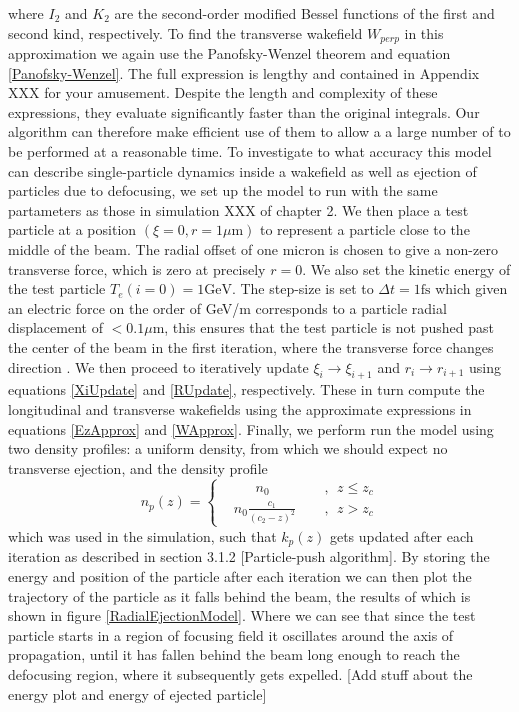 where $I_2$ and $K_2$ are the second-order modified Bessel functions of the first and second kind, respectively. To find the transverse wakefield $W_{perp}$ in this approximation we again use the Panofsky-Wenzel theorem and equation \ref{Panofsky-Wenzel}. The full expression is lengthy and contained in Appendix XXX for your amusement. Despite the length and complexity of these expressions, they evaluate significantly faster than the original integrals. Our algorithm can therefore make efficient use of them to allow a a large number of to be performed at a reasonable time. To investigate to what accuracy this model can describe single-particle dynamics inside a wakefield as well as ejection of particles due to defocusing, we set up the model to run with the same partameters as those in simulation XXX of chapter 2. We then place a test particle at a position $\left(\xi=0,r=1\mu \text{m}\right)$ to represent a particle close to the middle of the beam. The radial offset of one micron is chosen to give a non-zero transverse force, which is zero at precisely $r=0$. We also set the kinetic energy of the test particle $T_e(i=0)=1\text{GeV}$. The step-size is set to $\Delta t=1\text{fs}$ which given an electric force on the order of GeV/m corresponds to a particle radial displacement of $<0.1\mu \text{m}$, this ensures that the test particle is not pushed  past the center of the beam in the first iteration, where the transverse force changes direction . We then proceed to iteratively update $\xi_i\to\xi_{i+1}$ and $r_i\to r_{i+1}$ using equations \ref{XiUpdate} and \ref{RUpdate}, respectively. These in turn compute the longitudinal and transverse wakefields using the approximate expressions in equations \ref{EzApprox} and \ref{WApprox}. Finally, we perform run the model using two density profiles: a uniform density, from which we should expect no transverse ejection, and the density profile 
\begin{equation}
n_p(z)=\left\{\begin{aligned} &~~~~~~~n_0~~&&,~~z\leq z_c \\
&n_0\frac{c_1}{(c_2-z)^2}~~&&,~~z>z_c
 \end{aligned}\right.
\end{equation}
which was used in the simulation, such that $k_p(z)$ gets updated after each iteration as described in section 3.1.2 [Particle-push algorithm]. By storing the energy and position of the particle after each iteration we can then plot the trajectory of the particle as it falls behind the beam, the results of which is shown in figure \ref{RadialEjectionModel}. Where we can see that since the test particle starts in a region of focusing field it oscillates around the axis of propagation, until it has fallen behind the beam long enough to reach the defocusing region, where it subsequently gets expelled. [Add stuff about the energy plot and energy of ejected particle]
